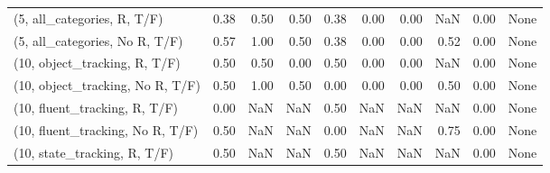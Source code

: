 \begin{table*}[h!]
\begin{adjustbox}{width=2\columnwidth,center}
\begin{tabular}{lrrr|rrr|rrr}
(5, all\_categories, R, T/F)          &                      0.38 &                  0.50 &                      0.50 &                          0.38 &                      0.00 &                          0.00 &                                    NaN &                               0.00 &                                  None \\
(5, all\_categories, No R, T/F)       &                      0.57 &                  1.00 &                      0.50 &                          0.38 &                      0.00 &                          0.00 &                                   0.52 &                               0.00 &                                  None \\



\midrule
(10, object\_tracking, R, T/F)         &                      0.50 &                  0.50 &                      0.00 &                          0.50 &                      0.00 &                          0.00 &                                    NaN &                               0.00 &                                  None \\
(10, object\_tracking, No R, T/F)      &                      0.50 &                  1.00 &                      0.50 &                          0.00 &                      0.00 &                          0.00 &                                   0.50 &                               0.00 &                                  None \\
(10, fluent\_tracking, R, T/F)         &                      0.00 &                   NaN &                       NaN &                          0.50 &                       NaN &                           NaN &                                    NaN &                               0.00 &                                  None \\
(10, fluent\_tracking, No R, T/F)      &                      0.50 &                   NaN &                       NaN &                          0.00 &                       NaN &                           NaN &                                   0.75 &                               0.00 &                                  None \\
(10, state\_tracking, R, T/F)          &                      0.50 &                   NaN &                       NaN &                          0.50 &                       NaN &                           NaN &                                    NaN &                               0.00 &                                  None \\

\end{tabular}
\end{adjustbox}
\end{table*}
